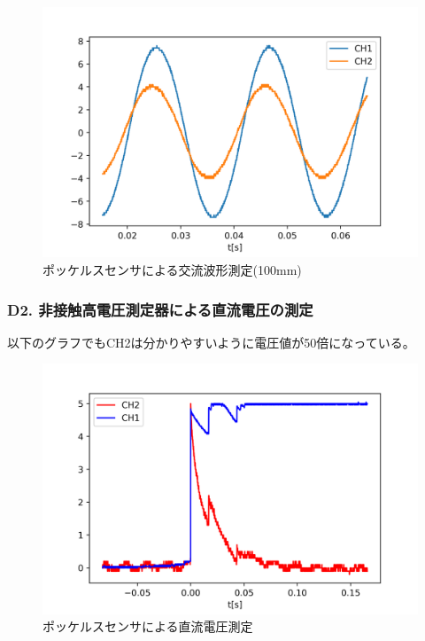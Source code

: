 \documentclass[dvipdfmx, twocolumn]{jsarticle}
\begin{document}
\begin{figure}[H]
\begin{center}
\includegraphics[scale = 0.5]{D13.png}
\caption{ポッケルスセンサによる交流波形測定(100mm)}
\end{center}
\end{figure}
\subsubsection*{D2. 非接触高電圧測定器による直流電圧の測定}

以下のグラフでもCH2は分かりやすいように電圧値が50倍になっている。
\begin{figure}[H]
\begin{center}
\includegraphics[scale = 0.5]{D2.png}
\caption{ポッケルスセンサによる直流電圧測定}
\end{center}
\end{figure}
\end{document}
